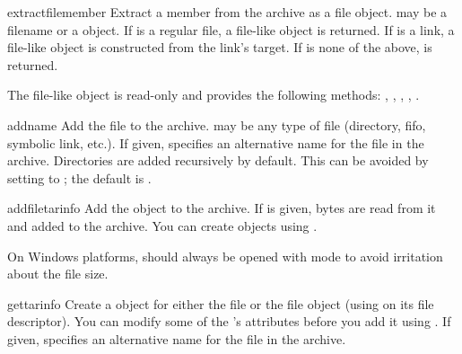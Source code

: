 \begin{methoddesc}{extractfile}{member}
    Extract a member from the archive as a file object.
     may be a filename or a  object.
    If  is a regular file, a file-like object is returned.
    If  is a link, a file-like object is constructed from the
    link's target.
    If  is none of the above,  is returned.
    \begin{notice}
        The file-like object is read-only and provides the following methods:
        , , ,
        , .
    \end{notice}
\end{methoddesc}

\begin{methoddesc}{add}{name}
    Add the file  to the archive.  may be any type
    of file (directory, fifo, symbolic link, etc.).
    If given,  specifies an alternative name for the file in the
    archive. Directories are added recursively by default.
    This can be avoided by setting  to ;
    the default is .
\end{methoddesc}

\begin{methoddesc}{addfile}{tarinfo}
    Add the  object  to the archive.
    If  is given,  bytes are read
    from it and added to the archive.  You can create  objects
    using .
    \begin{notice}
    On Windows platforms,  should always be opened with mode
     to avoid irritation about the file size.
    \end{notice}
\end{methoddesc}

\begin{methoddesc}{gettarinfo}{}
    Create a  object for either the file  or
    the file object  (using  on its
    file descriptor).  You can modify some of the 's
    attributes before you add it using .  If given,
     specifies an alternative name for the file in the
    archive.
\end{methoddesc}

